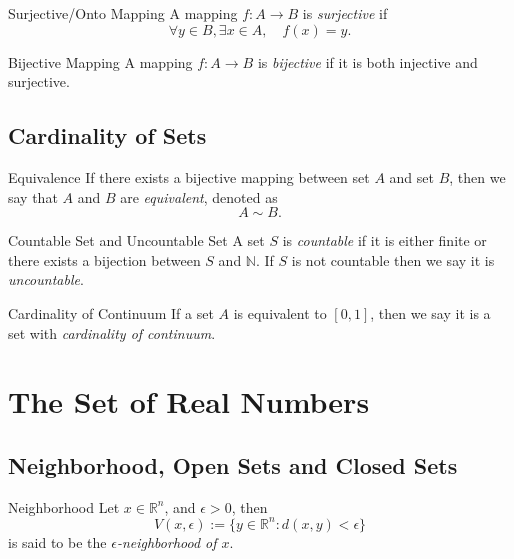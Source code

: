 \begin{definition}{Surjective/Onto Mapping}{}
  A mapping $f:A \rightarrow B$ is \emph{surjective} if
  \begin{equation}
    \forall y \in B, \exists x \in A, \quad f(x) = y.
  \end{equation}
\end{definition}

\begin{definition}{Bijective Mapping}{}
  A mapping $f:A \rightarrow B$ is \emph{bijective} if it is both injective and surjective.
\end{definition}

\subsection{Cardinality of Sets}

\begin{definition}{Equivalence}{}
  If there exists a bijective mapping between set $A$ and set $B$,
  then we say that $A$ and $B$ are \emph{equivalent}, denoted as
  \begin{equation}
    A \sim B.
  \end{equation}
\end{definition}

\begin{definition}{Countable Set and Uncountable Set}{}
  A set $S$ is \emph{countable} if it is either finite or there
  exists a bijection between $S$ and $\mathbb{N}$.
  If $S$ is not countable then we say it is \emph{uncountable}.
\end{definition}

\begin{definition}{Cardinality of Continuum}{}
  If a set $A$ is equivalent to $[0, 1]$,
  then we say it is a set with \emph{cardinality of continuum}.
\end{definition}

\section{The Set of Real Numbers}

\subsection{Neighborhood, Open Sets and Closed Sets}

\begin{definition}{Neighborhood}{}
  Let $x \in \mathbb{R}^n$, and $\epsilon > 0$, then 
  \begin{equation}
    V(x, \epsilon) := \{y \in \mathbb{R}^n: d(x,y) < \epsilon\}
  \end{equation}
  is said to be the \emph{$\epsilon$-neighborhood of $x$}.
\end{definition}


